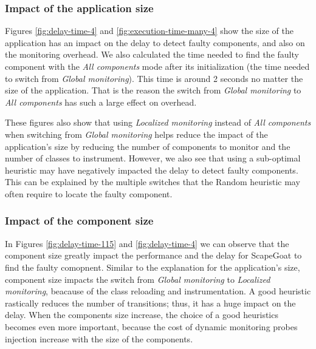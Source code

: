 \subsubsection{Impact of the application size}
Figures \ref{fig:delay-time-4} and \ref{fig:execution-time-many-4} show the size of the application has an impact on the delay to detect faulty components, and also on the monitoring overhead.
We also calculated the time needed to find the faulty component with the \emph{All components} mode after its initialization (the time needed to switch from \emph{Global monitoring}).
This time is around 2 seconds no matter the size of the application.
That is the reason the switch from \emph{Global monitoring} to \emph{All components} has such a large effect on overhead.

These figures also show that using \emph{Localized monitoring} instead of \emph{All components} when switching from \emph{Global monitoring} helps reduce the impact of the application's size by reducing the number of components to monitor and the number of classes to instrument.
However, we also see that using a sub-optimal heuristic may have negatively impacted the delay to detect faulty components.
This can be explained by the multiple switches that the Random heuristic may often require to locate the faulty component.

\subsubsection{Impact of the component size}
In Figures \ref{fig:delay-time-115} and \ref{fig:delay-time-4} we can observe that the component size greatly impact the performance and the delay for ScapeGoat to find the faulty comopnent. 
Similar to the explanation for the application's size, component size impacts the switch from \emph{Global monitoring} to \emph{Localized monitoring}, beacause of the class reloading and instrumentation.
A good heuristic rastically reduces the number of transitions; thus, it has a huge impact on the delay. 
When the components size increase, the choice of a good heuristics becomes even more important, because the cost of dynamic monitoring probes injection increase with the size of the components.

